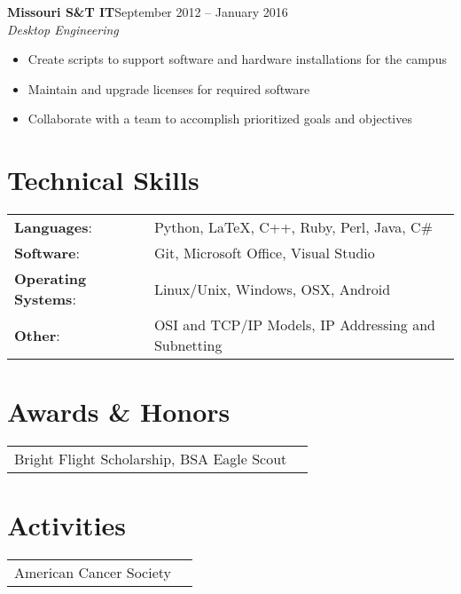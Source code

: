\documentclass[margin]{res}
\begin{document}
\begin{resume}
    	   \textbf{Missouri S\&T IT}\hfill September 2012 -- January 2016\\
       \textit{Desktop Engineering}\hfill
       \begin{itemize} \itemsep -1pt  %
         \item Create scripts to support software and hardware installations for the campus
         \item Maintain and upgrade licenses for required software
         \item Collaborate with a team to accomplish prioritized goals and objectives
       \end{itemize}
   


    \section{Technical Skills}
      \begin{tabular}{l p{3.6in}}
        \textbf{Languages}:                   & Python, \LaTeX, C++, Ruby, Perl, Java, C\# \\ [1pt]
        \textbf{Software}:                    & Git, Microsoft Office, Visual Studio \\ [1pt]

        \textbf{Operating Systems}:           & Linux/Unix, Windows, OSX, Android \\ [1pt]
        \textbf{Other}:                       & OSI and TCP/IP Models, IP Addressing and Subnetting \\ [1pt]
      \end{tabular}

	\section{Awards \& Honors} 
      \begin{tabular}{l p{4in}}
        Bright Flight Scholarship, BSA Eagle Scout \\ [1pt]
      \end{tabular}
      
	\section{Activities} 
      \begin{tabular}{l p{4in}}
        American Cancer Society \\ [1pt]
      \end{tabular}
      
  \end{resume} 
\end{document}
